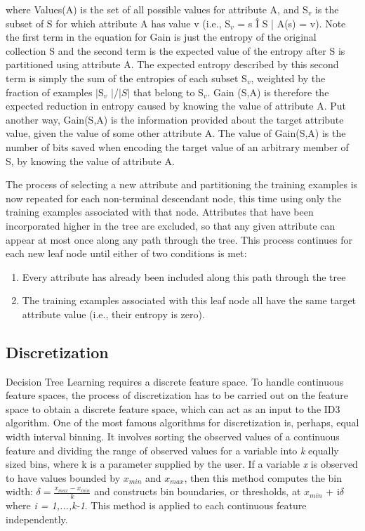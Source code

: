\documentclass[12pt]{report}
\begin{document}
where Values(A) is the set of all possible values for attribute A, and S$_{v}$ is the subset of S for which attribute A has value v (i.e., S$_{v}$ = {s Î S | A(s) = v}). Note the first term in the equation for Gain is just the entropy of the original collection S and the second term is the expected value of the entropy after S is partitioned using attribute A. The expected entropy described by this second term is simply the sum of the entropies of each subset S$_{v}$, weighted by the fraction of examples $|$S$_{v}$ $|$/$|S|$ that belong to S$_{v}$. Gain (S,A) is therefore the expected reduction in entropy caused by knowing the value of attribute A. Put another way, Gain(S,A) is the information provided about the target attribute value, given the value of some other attribute A. The value of Gain(S,A) is the number of bits saved when encoding the target value of an arbitrary member of S, by knowing the value of attribute A.

The process of selecting a new attribute and partitioning the training examples is now repeated for each non-terminal descendant node, this time using only the training examples associated with that node. Attributes that have been incorporated higher in the tree are excluded, so that any given attribute can appear at most once along any path through the tree. This process continues for each new leaf node until either of two conditions is met:

\begin{enumerate}
\item{Every attribute has already been included along this path through the tree}
\item{The training examples associated with this leaf node all have the same target attribute value (i.e., their entropy is zero).} 

\end{enumerate}

\subsection{Discretization}

Decision Tree Learning requires a discrete feature space. To handle continuous feature spaces, the process of discretization has to be carried out on the feature space to obtain a discrete feature space, which can act as an input to the ID3 algorithm. One of the most famous algorithms for discretization is, perhaps, equal width interval binning. It involves sorting the observed values of a continuous feature and dividing the range of observed values for a variable into \textit{k} equally sized bins, where k is a parameter supplied by the user. If a variable \textit{x} is observed to have values bounded by $x_{min}$ and $x_{max}$, then this method computes the bin width:         \begin{math}\delta = \frac{x_{max} - x_{min}}{k} \end{math}
and constructs bin boundaries, or thresholds, at $x_{min}$ + i$\delta$ where \textit{i = 1,...,k-1}. This method is applied to each continuous feature independently.
\end{document}
